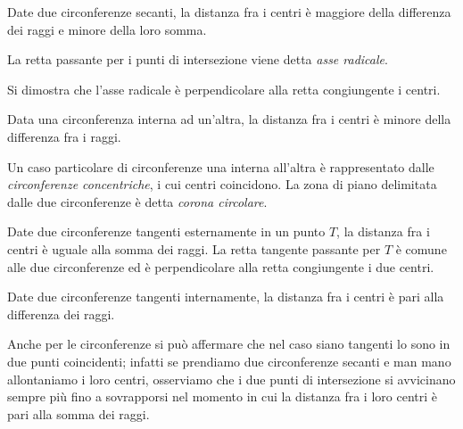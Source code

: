 \begin{teorema}
Date due circonferenze secanti, la distanza fra i centri è maggiore della differenza dei raggi e minore della loro somma.
\end{teorema}

\begin{figure}[htb]
	\centering
\end{figure}

La retta passante per i punti di intersezione viene detta \emph{asse radicale}.\label{def:asse_radicale}

Si dimostra che l'asse radicale è perpendicolare alla retta congiungente i centri.

\begin{teorema}
Data una circonferenza interna ad un'altra, la distanza fra i centri è minore della differenza fra i raggi.
\end{teorema}

\begin{figure}[htb]
	\centering\hspace{0.5cm}
\end{figure}

Un caso particolare di circonferenze una interna all'altra è rappresentato dalle \emph{circonferenze concentriche}, i cui centri coincidono. La zona di piano delimitata dalle due circonferenze è detta \emph{corona circolare}.

\begin{teorema}
Date due circonferenze tangenti esternamente in un punto $T$, la distanza fra i centri è uguale alla somma dei raggi. La retta tangente passante per $T$ è comune alle due circonferenze ed è perpendicolare alla retta congiungente i due centri.
\end{teorema}

\begin{figure}[htb]
	\centering
\end{figure}

\begin{teorema}
Date due circonferenze tangenti internamente, la distanza fra i centri è pari alla differenza dei raggi.
\end{teorema}


Anche per le circonferenze si può affermare che nel caso siano tangenti lo sono in due punti coincidenti; infatti se prendiamo due circonferenze secanti e man mano allontaniamo i loro centri, osserviamo che i due punti di intersezione si avvicinano sempre più fino a sovrapporsi nel momento in cui la distanza fra i loro centri è pari alla somma dei raggi.

